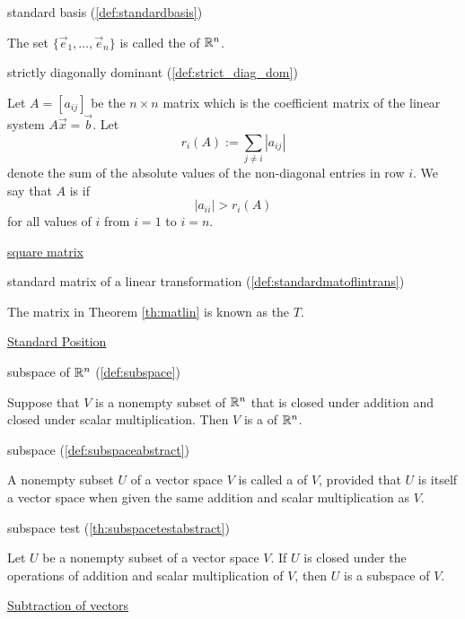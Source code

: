 \documentclass{ximera}
\begin{document}
standard basis (\ref{def:standardbasis})
\begin{expandable}
    The set $\{\vec{e}_1, \ldots ,\vec{e}_n\}$ is called the  of $\mathbb{R}^n$.
\end{expandable}

strictly diagonally dominant (\ref{def:strict_diag_dom})
\begin{expandable}
    Let $A=[a_{ij}]$ be the $n\times n$ matrix which is the coefficient matrix of the linear system $A \vec{x}= \vec{b}$.  Let
$$
r_i(A):= \sum_{j \ne i} |a_{ij}|
$$
denote the sum of the absolute values of the non-diagonal entries in row $i$.  We say that $A$ is  if 
$$|a_{ii}|>r_i(A)$$
for all values of $i$ from $i=1$ to $i=n$.
\end{expandable}

\href{https://ximera.osu.edu/oerlinalg/LinearAlgebra/MAT-0010/main}{square matrix}

standard matrix of a linear transformation (\ref{def:standardmatoflintrans})
\begin{expandable}
    The matrix in Theorem \ref{th:matlin} is known as the  $T$.
\end{expandable}

\href{https://ximera.osu.edu/oerlinalg/LinearAlgebra/VEC-0010/main}{Standard Position}

subspace of $\mathbb{R}^n$ (\ref{def:subspace})
\begin{expandable}
    Suppose that $V$ is a nonempty subset of $\mathbb{R}^n$ that is closed under addition and closed under scalar multiplication.  Then $V$ is a  of $\mathbb{R}^n$.
\end{expandable}

subspace (\ref{def:subspaceabstract})
\begin{expandable}
    A nonempty subset $U$ of a vector space $V$ is called a  of $V$, provided that $U$ is itself a vector space when given the same addition and scalar multiplication as $V$.
\end{expandable}

subspace test (\ref{th:subspacetestabstract})
\begin{expandable}
    Let $U$ be a nonempty subset of a vector space $V$.  If $U$ is closed under the operations of addition and scalar multiplication of $V$, then $U$ is a subspace of $V$.
\end{expandable}

\href{https://ximera.osu.edu/oerlinalg/LinearAlgebra/VEC-0030/main}{Subtraction of vectors}
\end{document}

